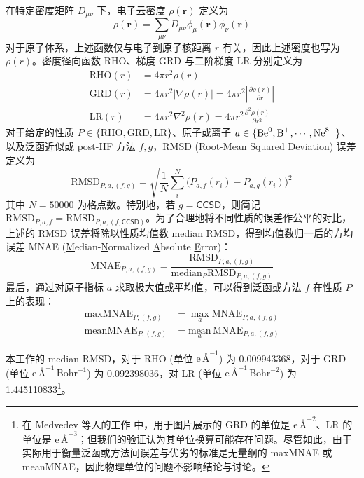在特定密度矩阵 $D_{\mu \nu}$ 下，电子云密度 $\rho(\bm{r})$ 定义为
\begin{equation}
    \rho(\bm{r}) = \sum_{\mu \nu} D_{\mu \nu} \phi_{\mu} (\bm{r}) \phi_{\nu} (\bm{r})
\end{equation}
对于原子体系，上述函数仅与电子到原子核距离 $r$ 有关，因此上述密度也写为 $\rho(r)$。密度径向函数 RHO、梯度 GRD 与二阶梯度 LR 分别定义为
\begin{align}
    \text{RHO}(r) &= 4 \pi r^2 \rho(r) \\
    \text{GRD}(r) &= 4 \pi r^2 | \nabla \rho(r) | = 4 \pi r^2 \left| \frac{\partial \rho(r)}{\partial r} \right| \\
    \text{LR}(r) &= 4 \pi r^2 \nabla^2 \rho(r) = 4 \pi r^2 \frac{\partial^2 \rho(r)}{\partial r^2}
\end{align}
对于给定的性质 $P \in \{\text{RHO}, \text{GRD}, \text{LR}\}$、原子或离子 $a \in \{\ce{Be^0}, \ce{B^+}, \cdots, \ce{Ne^8+}\}$、以及泛函近似或 post-HF 方法 $f, g$，RMSD (\underline{R}oot-\underline{M}ean \underline{S}quared \underline{D}eviation) 误差定义为
\begin{equation}
    \text{RMSD}_{P, a, (f, g)} = \sqrt{\frac{1}{N} \sum_i^N \big(P_{a, f} (r_i) - P_{a, g} (r_i) \big)^2}
\end{equation}
其中 $N = 50000$ 为格点数。特别地，若 $g = \textsf{CCSD}$，则简记 $\text{RMSD}_{P, a, f} = \text{RMSD}_{P, a, (f, \textsf{CCSD})}$。为了合理地将不同性质的误差作公平的对比，上述的 RMSD 误差将除以性质均值数 median RMSD，得到均值数归一后的方均误差 MNAE (\underline{M}edian-\underline{N}ormalized \underline{A}bsolute \underline{E}rror)：
\begin{equation}
    \text{MNAE}_{P, a, (f, g)} = \frac{\text{RMSD}_{P, a, (f, g)}}{\text{median}_{P} \text{RMSD}_{P, a, (f, g)}}
\end{equation}
最后，通过对原子指标 $a$ 求取极大值或平均值，可以得到泛函或方法 $f$ 在性质 $P$ 上的表现：
\begin{align}
    \text{maxMNAE}_{P, (f, g)} &= \max_a \text{MNAE}_{P, a, (f, g)} \\
    \text{meanMNAE}_{P, (f, g)} &= \underset{a}{\text{mean}} \, \text{MNAE}_{P, a, (f, g)}
\end{align}

本工作的 median RMSD，对于 RHO (单位 $\text{e} \, \text{\AA}^{-1}$) 为 0.009943368，对于 GRD (单位 $\text{e} \, \text{\AA}^{-1} \, \text{Bohr}^{-1}$) 为 0.092398036，对 LR (单位 $\text{e} \, \text{\AA}^{-1} \, \text{Bohr}^{-2}$) 为 1.445110833\footnote{在 Medvedev 等人的工作\cite{Medvedev-Lyssenko.S.2017} 中，用于图片展示的 GRD 的单位是 $\text{e} \, \text{\AA}^{-2}$、LR 的单位是 $\text{e} \, \text{\AA}^{-3}$；但我们的验证认为其单位换算可能存在问题。尽管如此，由于实际用于衡量泛函或方法间误差与优劣的标准是无量纲的 maxMNAE 或 meanMNAE，因此物理单位的问题不影响结论与讨论。}。

